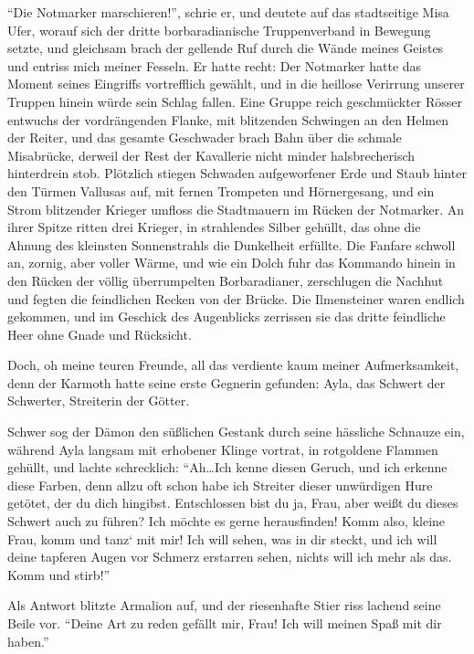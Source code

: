 ``Die Notmarker marschieren!'', schrie er, und deutete auf das stadtseitige Misa Ufer, worauf sich der dritte borbaradianische Truppenverband in Bewegung setzte, und gleichsam brach der gellende Ruf durch die Wände meines Geistes und entriss mich meiner Fesseln. Er hatte recht: Der Notmarker hatte das Moment seines Eingriffs vortrefflich gewählt, und in die heillose Verirrung unserer Truppen hinein würde sein Schlag fallen. Eine Gruppe reich geschmückter Rösser entwuchs der vordrängenden Flanke, mit blitzenden Schwingen an den Helmen der Reiter, und das gesamte Geschwader brach Bahn über die schmale Misabrücke, derweil der Rest der Kavallerie nicht minder halsbrecherisch hinterdrein stob. Plötzlich stiegen Schwaden aufgeworfener Erde und Staub hinter den Türmen Vallusas auf, mit fernen Trompeten und Hörnergesang, und ein Strom blitzender Krieger umfloss die Stadtmauern im Rücken der Notmarker. An ihrer Spitze ritten drei Krieger, in strahlendes Silber gehüllt, das ohne die Ahnung des kleinsten Sonnenstrahls die Dunkelheit erfüllte. Die Fanfare schwoll an, zornig, aber voller Wärme, und wie ein Dolch fuhr das Kommando hinein in den Rücken der völlig überrumpelten Borbaradianer, zerschlugen die Nachhut und fegten die feindlichen Recken von der Brücke. Die Ilmensteiner waren endlich gekommen, und im Geschick des Augenblicks zerrissen sie das dritte feindliche Heer ohne Gnade und Rücksicht.

Doch, oh meine teuren Freunde, all das verdiente kaum meiner Aufmerksamkeit, denn der Karmoth hatte seine erste Gegnerin gefunden: Ayla, das Schwert der Schwerter, Streiterin der Götter.

Schwer sog der Dämon den süßlichen Gestank durch seine hässliche Schnauze ein, während Ayla langsam mit erhobener Klinge vortrat, in rotgoldene Flammen gehüllt, und lachte schrecklich: ``Ah\dots Ich kenne diesen Geruch, und ich erkenne diese Farben, denn allzu oft schon habe ich Streiter dieser unwürdigen Hure getötet, der du dich hingibst. Entschlossen bist du ja, Frau, aber weißt du dieses Schwert auch zu führen? Ich möchte es gerne herausfinden! Komm also, kleine Frau, komm und tanz‘ mit mir! Ich will sehen, was in dir steckt, und ich will deine tapferen Augen vor Schmerz erstarren sehen, nichts will ich mehr als das. Komm und stirb!''

Als Antwort blitzte Armalion auf, und der riesenhafte Stier riss lachend seine Beile vor. ``Deine Art zu reden gefällt mir, Frau! Ich will meinen Spaß mit dir haben.''

